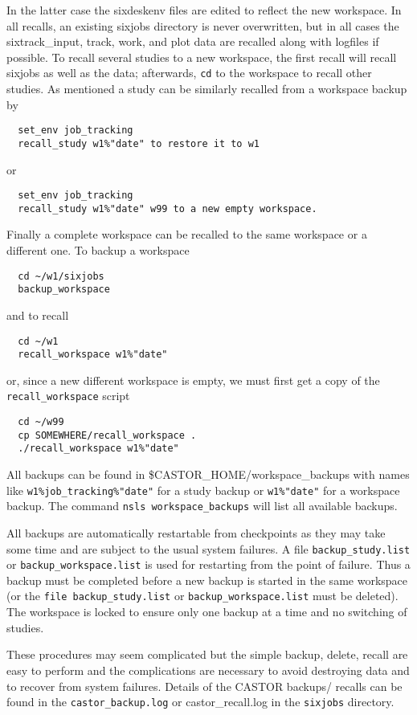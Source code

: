\documentclass{article}    %
\begin{document}
In the latter case the sixdeskenv files are edited to reflect the new
workspace. In all recalls, an 
existing sixjobs directory is never overwritten, but in all cases the 
sixtrack\_input, track, work, and plot data are recalled along with 
logfiles if possible.
 To recall several studies to a new workspace, the first recall will
recall sixjobs as well as the data; afterwards, {\tt cd} to the workspace
to recall other studies.
 As mentioned a study can be similarly recalled from a workspace backup by
\begin{verbatim}
  set_env job_tracking
  recall_study w1%"date" to restore it to w1 
\end{verbatim}
or 
\begin{verbatim}
  set_env job_tracking
  recall_study w1%"date" w99 to a new empty workspace.
\end{verbatim}
 Finally a complete workspace can be recalled to the same workspace or a
different one.
To backup a workspace
\begin{verbatim} 
  cd ~/w1/sixjobs 
  backup_workspace
\end{verbatim}
and to recall
\begin{verbatim}
  cd ~/w1
  recall_workspace w1%"date"
\end{verbatim}
or, since a new different workspace is empty, we must first
get a copy of the {\tt recall\_workspace} script  
\begin{verbatim}
  cd ~/w99
  cp SOMEWHERE/recall_workspace .
  ./recall_workspace w1%"date"
\end{verbatim}

 All backups can be found in \$CASTOR\_HOME/workspace\_backups with names like
{\tt w1\%job\_tracking\%"date"} for a study backup
or
{\tt w1\%"date"} for a workspace backup.
The command {\tt nsls workspace\_backups} will list all available backups.

 All backups are automatically restartable from checkpoints as they may take
some time and are subject to the usual system failures. A file 
{\tt backup\_study.list} or {\tt backup\_workspace.list} is used for restarting
from the point of failure. Thus a backup must be completed before a new
backup is started in the same workspace (or the {\tt file backup\_study.list} or
{\tt backup\_workspace.list} must be deleted). The workspace is locked to ensure
only one backup at a time and no switching of studies.

 These procedures may seem complicated but the simple backup, delete, recall
are easy to perform and the complications are necessary to avoid destroying
data and to recover from system failures. Details of the CASTOR backups/
recalls can be found in the {\tt castor\_backup.log} or {castor\_recall.log}
in the {\tt sixjobs} directory.
\end{document}
